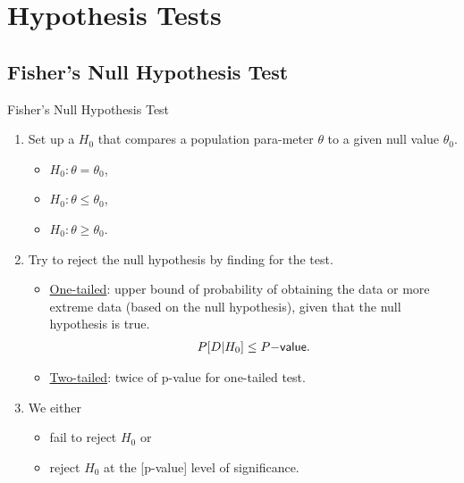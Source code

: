 \section{Hypothesis Tests}


\subsection{Fisher's Null Hypothesis Test}

\begin{frame}{Fisher's Null Hypothesis Test}

\begin{enumerate}
	\justifying
	\item Set up a  $H_0$ that compares a population para-meter $\theta$ to a given null value $\theta_0$.
	\begin{itemize}
		\item $H_0: \theta = \theta_0$,
		\item $H_0: \theta \leq \theta_0$,
		\item $H_0: \theta \geq \theta_0$.
	\end{itemize}
	\item Try to reject the null hypothesis by finding  for the test.\\
	\begin{itemize}
		\justifying
		\item \underline{One-tailed}: upper bound of probability of obtaining the data or more extreme data (based on the null hypothesis), given that the null hypothesis is true.
		\begin{align*}
		P[D|H_0]\leq P\mathsf{-value}.
		\end{align*}
		\item \underline{Two-tailed}: twice of p-value for one-tailed test.
	\end{itemize}
	\item We either 
	\begin{itemize}
		\item fail to reject $H_0$ or
		\item reject $H_0$ at the [p-value] level of significance.
	\end{itemize}
\end{enumerate}

\end{frame}



